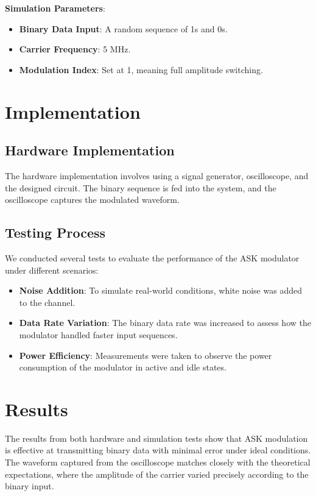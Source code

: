 \documentclass[12pt,a4paper]{article}
\begin{document}
\textbf{Simulation Parameters}:
\begin{itemize}
    \item \textbf{Binary Data Input}: A random sequence of 1s and 0s.
    \item \textbf{Carrier Frequency}: 5 MHz.
    \item \textbf{Modulation Index}: Set at 1, meaning full amplitude switching.
\end{itemize}

\section*{Implementation}
\subsection*{Hardware Implementation}
The hardware implementation involves using a signal generator, oscilloscope, and the designed circuit. The binary sequence is fed into the system, and the oscilloscope captures the modulated waveform.

\subsection*{Testing Process}
We conducted several tests to evaluate the performance of the ASK modulator under different scenarios:
\begin{itemize}
    \item \textbf{Noise Addition}: To simulate real-world conditions, white noise was added to the channel.
    \item \textbf{Data Rate Variation}: The binary data rate was increased to assess how the modulator handled faster input sequences.
    \item \textbf{Power Efficiency}: Measurements were taken to observe the power consumption of the modulator in active and idle states.
\end{itemize}

\section*{Results}
The results from both hardware and simulation tests show that ASK modulation is effective at transmitting binary data with minimal error under ideal conditions. The waveform captured from the oscilloscope matches closely with the theoretical expectations, where the amplitude of the carrier varied precisely according to the binary input.
\end{document}

